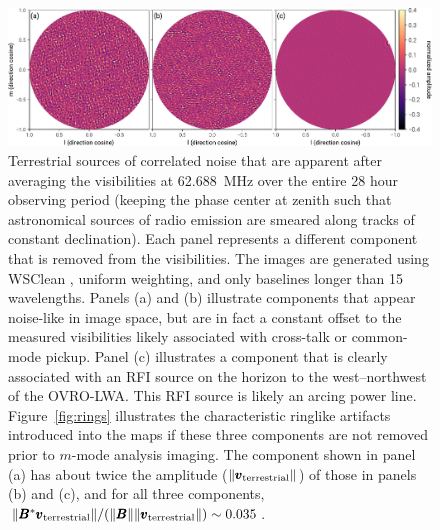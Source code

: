 \begin{bibunit}
\begin{figure}[t]
    \includegraphics[width=\textwidth]{figures/chapter3/smeared}
    \caption{
        Terrestrial sources of correlated noise that are apparent after averaging the visibilities
        at 62.688~MHz over the entire 28 hour observing period (keeping the phase center at zenith
        such that astronomical sources of radio emission are smeared along tracks of constant
        declination). Each panel represents a different component that is removed from the
        visibilities. The images are generated using WSClean \citep{2014MNRAS.444..606O}, uniform
        weighting, and only baselines longer than 15 wavelengths. Panels (a) and (b) illustrate
        components that appear noise-like in image space, but are in fact a constant offset to the
        measured visibilities likely associated with cross-talk or common-mode pickup. Panel (c)
        illustrates a component that is clearly associated with an RFI source on the horizon to the
        west--northwest of the OVRO-LWA. This RFI source is likely an arcing power line.
        Figure~\ref{fig:rings} illustrates the characteristic ringlike artifacts introduced into the
        maps if these three components are not removed prior to $m$-mode analysis imaging. The
        component shown in panel (a) has about twice the amplitude ($\|\pmb v_\text{terrestrial}\|$)
        of those in panels (b) and (c), and for all three components, $\|\pmb B^*\pmb
        v_\text{terrestrial}\|/(\|\pmb B\|\|\pmb v_\text{terrestrial}\|) \sim 0.035$.
    }
    \label{fig:fitrfi}
\end{figure}


\end{bibunit}
